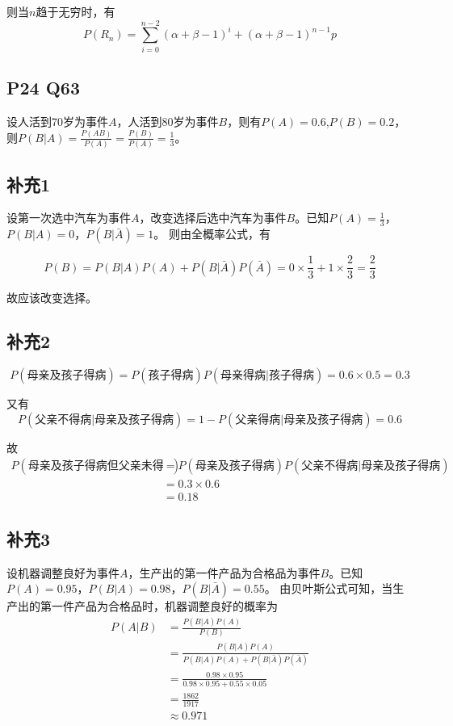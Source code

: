 \documentclass[a4paper,12pt]{ctexart}
\begin{document}
则当$n$趋于无穷时，有
\begin{equation*}
	P(R_n) = \sum_{i=0}^{n-2}(\alpha + \beta - 1)^i + (\alpha + \beta - 1)^{n-1} p
\end{equation*}

\subsection*{P24 Q63}
设人活到70岁为事件$A$，人活到80岁为事件$B$，则有$P(A) = 0.6$,$P(B) = 0.2$，则$P(B|A) = \frac{P(AB)}{P(A)} = \frac{P(B)}{P(A)} = \frac{1}{3}$。

\subsection*{补充1}
设第一次选中汽车为事件$A$，改变选择后选中汽车为事件$B$。已知$P(A) = \frac{1}{3}$，$P(B|A) = 0$，$P(B|\bar{A}) = 1$。
则由全概率公式，有

\begin{equation*}
	P(B) = P(B|A)P(A) + P(B|\bar{A})P(\bar{A}) = 0 \times \frac{1}{3} + 1 \times \frac{2}{3} = \frac{2}{3}
\end{equation*}

故应该改变选择。

\subsection*{补充2}
\begin{equation*}
	P(\text{母亲及孩子得病})=P(\text{孩子得病})P(\text{母亲得病}|\text{孩子得病}) = 0.6 \times 0.5 = 0.3
\end{equation*}

又有
\begin{equation*}
	P(\text{父亲不得病}|\text{母亲及孩子得病}) = 1 - P(\text{父亲得病}|\text{母亲及孩子得病}) = 0.6
\end{equation*}

故
\begin{align*}
	P(\text{母亲及孩子得病但父亲未得病}) &= P(\text{母亲及孩子得病})P(\text{父亲不得病}|\text{母亲及孩子得病}) \\
	&= 0.3 \times 0.6 \\
	&= 0.18
\end{align*}

\subsection*{补充3}
设机器调整良好为事件$A$，生产出的第一件产品为合格品为事件$B$。已知$P(A)=0.95$，$P(B|A)=0.98$，$P(B|\bar{A})=0.55$。
由贝叶斯公式可知，当生产出的第一件产品为合格品时，机器调整良好的概率为
\begin{align*}
	P(A|B) &= \frac{P(B|A)P(A)}{P(B)}\\
	&= \frac{P(B|A)P(A)}{P(B|A)P(A) + P(B|\bar{A})P(\bar{A})}\\
	&= \frac{0.98 \times 0.95}{0.98 \times 0.95 + 0.55 \times 0.05}\\
	&= \frac{1862}{1917}\\
	&\approx 0.971
\end{align*}
\end{document}
